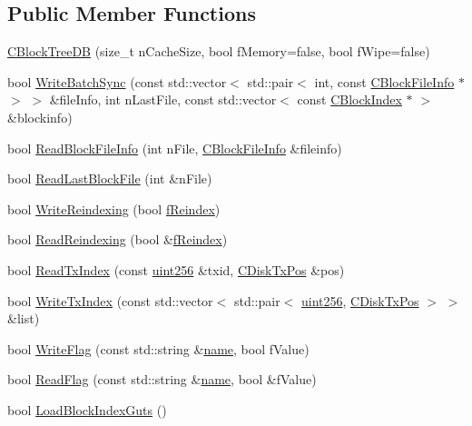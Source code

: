 \subsection*{Public Member Functions}
\begin{DoxyCompactItemize}
\item 
\hyperlink{class_c_block_tree_d_b_a52fd1b1dc02c2a4e977099e2c2c50424}{C\+Block\+Tree\+D\+B} (size\+\_\+t n\+Cache\+Size, bool f\+Memory=false, bool f\+Wipe=false)
\item 
bool \hyperlink{class_c_block_tree_d_b_aa4b53c1cae368f02f56244af5f2499d7}{Write\+Batch\+Sync} (const std\+::vector$<$ std\+::pair$<$ int, const \hyperlink{class_c_block_file_info}{C\+Block\+File\+Info} $\ast$ $>$ $>$ \&file\+Info, int n\+Last\+File, const std\+::vector$<$ const \hyperlink{class_c_block_index}{C\+Block\+Index} $\ast$ $>$ \&blockinfo)
\item 
bool \hyperlink{class_c_block_tree_d_b_a6f951198dc53fbe9194626ff82638656}{Read\+Block\+File\+Info} (int n\+File, \hyperlink{class_c_block_file_info}{C\+Block\+File\+Info} \&fileinfo)
\item 
bool \hyperlink{class_c_block_tree_d_b_adb1276fe2f0e0c4c106660948c581711}{Read\+Last\+Block\+File} (int \&n\+File)
\item 
bool \hyperlink{class_c_block_tree_d_b_a8fa5d150b98f4fd1aa8cf503eddfccef}{Write\+Reindexing} (bool \hyperlink{main_8h_a8e0eca589b2d4254a65f04c5d91888b2}{f\+Reindex})
\item 
bool \hyperlink{class_c_block_tree_d_b_a1abf6fc392048428aa24a12b7942824b}{Read\+Reindexing} (bool \&\hyperlink{main_8h_a8e0eca589b2d4254a65f04c5d91888b2}{f\+Reindex})
\item 
bool \hyperlink{class_c_block_tree_d_b_a74383427266d627e84c2d0c8e21e03c7}{Read\+Tx\+Index} (const \hyperlink{classuint256}{uint256} \&txid, \hyperlink{struct_c_disk_tx_pos}{C\+Disk\+Tx\+Pos} \&pos)
\item 
bool \hyperlink{class_c_block_tree_d_b_a1e03745f9675ad352a1483a0aa7ef308}{Write\+Tx\+Index} (const std\+::vector$<$ std\+::pair$<$ \hyperlink{classuint256}{uint256}, \hyperlink{struct_c_disk_tx_pos}{C\+Disk\+Tx\+Pos} $>$ $>$ \&list)
\item 
bool \hyperlink{class_c_block_tree_d_b_af2f65b70ac5d8a198d4f29a7e909c08a}{Write\+Flag} (const std\+::string \&\hyperlink{rest_8cpp_a8f8f80d37794cde9472343e4487ba3eb}{name}, bool f\+Value)
\item 
bool \hyperlink{class_c_block_tree_d_b_acd779c4653fd9a87fffe95d53ce7c6d3}{Read\+Flag} (const std\+::string \&\hyperlink{rest_8cpp_a8f8f80d37794cde9472343e4487ba3eb}{name}, bool \&f\+Value)
\item 
bool \hyperlink{class_c_block_tree_d_b_a12be19bb1d7253eeb40e1aa88b032346}{Load\+Block\+Index\+Guts} ()
\end{DoxyCompactItemize}


